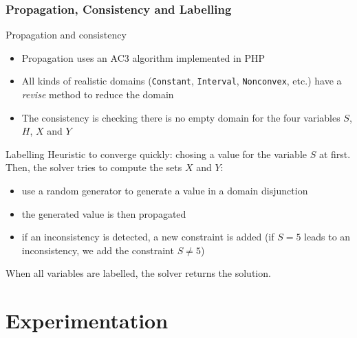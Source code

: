 \documentclass[9pt]{beamer}
\newcommand{\code}[1]{\texttt{#1}}
\newcommand{\outlinereminder}[0]{
  \frame{\frametitle{Outline}
  \tableofcontents[currentsection,subsectionstyle=show/show/hide]}
}
\begin{document}
\begin{frame}
\frametitle{Propagation, Consistency and Labelling}

\begin{block}{Propagation and consistency}
\begin{itemize}
\item Propagation uses an AC3 algorithm implemented in PHP
\item All kinds of realistic domains (\code{Constant}, \code{Interval},
\code{Nonconvex}, etc.) have a {\em revise} method to reduce the domain
\item The consistency is checking there is no empty domain for the four
variables $S$, $H$, $X$ and $Y$
\end{itemize}
\end{block}

\begin{block}{Labelling}
Heuristic to converge quickly: chosing a value for the variable $S$ at first.
Then, the solver tries to compute the sets $X$ and $Y$:
\begin{itemize}
\item use a random generator to generate a value in a domain disjunction
\item the generated value is then propagated
\item if an inconsistency is detected, a new constraint is added (if $S = 5$
leads to an inconsistency, we add the constraint $S \neq 5$)
\end{itemize}
When all variables are labelled, the solver returns the solution.
\end{block}

\end{frame}

\section{Experimentation}

\outlinereminder
\end{document}
